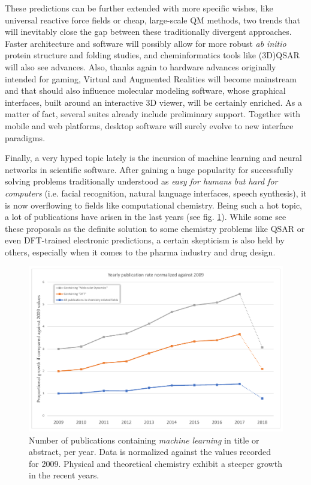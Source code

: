 These predictions can be further extended with more specific wishes, like universal reactive force fields or cheap, large-scale QM methods, two trends that will inevitably close the gap between these traditionally divergent approaches. Faster architecture and software will possibly allow for more robust \textit{ab initio} protein structure and folding studies,\cite{Lee2017} and cheminformatics tools like (3D)QSAR will also see advances.\cite{Cherkasov2013} Also, thanks again to hardware advances originally intended for gaming, Virtual and Augmented Realities will become mainstream and that should also influence molecular modeling software, whose graphical interfaces, built around an interactive 3D viewer, will be certainly enriched. As a matter of fact, several suites already include preliminary support.\cite{chimerax} Together with mobile and web platforms, desktop software will surely evolve to new interface paradigms.

Finally, a very hyped topic lately is the incursion of machine learning and neural networks in scientific software. After gaining a huge popularity for successfully solving problems traditionally understood as \textit{easy for humans but hard for computers} (i.e. facial recognition, natural language interfaces, speech synthesis), it is now overflowing to fields like computational chemistry. Being such a hot topic, a lot of publications have arisen in the last years (see fig. \ref{fig:machinelearningtrends}). While some see these proposals as the definite solution to some chemistry problems like QSAR\cite{paliwal2015,Ma2015,schutt2016,goh2017,goh2017b,koutsoukas2017,mayr2016} or even DFT-trained electronic predictions,\cite{faber2017} a certain skepticism is also held by others,\cite{forbes4decades,benhenda} especially when it comes to the pharma industry and drug design.


\begin{figure}[H]
	\includegraphics[width=\textwidth]{./figures/01/publication-trends-ml_crop.pdf}
	\caption[Machine learning publication trends]{Number of publications containing \textit{machine learning}  in title or abstract, per year. Data is normalized against the values recorded for 2009. Physical and theoretical chemistry exhibit a steeper growth in the recent years.}
	\label{fig:machinelearningtrends}
\end{figure}



